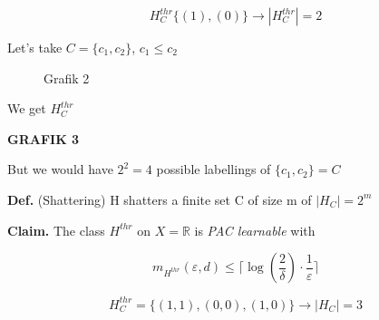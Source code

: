 \documentclass{scrarticle}
\begin{document}
\begin{equation*}
H_C^{thr} \{(1), (0)\} \rightarrow { |H_C^{thr}|} =2
\end{equation*}

Let's take $C=\{c_1, c_2\}$, $c_1 \leq c_2$

\vspace{1cm}

\begin{figure}[ht]
    \centering
    \caption{Grafik 2}
    \label{fig:R-space2}
\end{figure}



\vspace{1cm}

We get $H_C^{thr}$

\vspace{1cm}

\textbf{GRAFIK 3}

\vspace{1cm}

But we would have $2^2 = 4$ possible labellings of $\{c_1, c_2\} = C$

\vspace{0.5cm}

\textbf{Def.} (Shattering) H shatters a finite set C of size m of $|H_C|=2^m$

\vspace{0.5cm}

\textbf{Claim.} The class $H^{thr}$ on $X=\mathbb{R}$ is \textit{PAC learnable} with 

\begin{equation*}
    m_{H^{thr}} (\varepsilon, d) \leq \lceil \log (\frac{2}{\delta}) \cdot \frac{1}{\varepsilon} \rceil
\end{equation*}

\begin{equation*}
    H^{thr}_C = \{(1,1), (0,0), (1,0)\} \rightarrow |H_C| = 3
\end{equation*}
\end{document}
